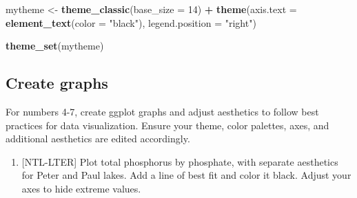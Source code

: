 \documentclass[]{article}
\newenvironment{Shaded}{\begin{snugshade}}{\end{snugshade}}
\newcommand{\DataTypeTok}[1]{\textcolor[rgb]{0.13,0.29,0.53}{#1}}
\newcommand{\DecValTok}[1]{\textcolor[rgb]{0.00,0.00,0.81}{#1}}
\newcommand{\KeywordTok}[1]{\textcolor[rgb]{0.13,0.29,0.53}{\textbf{#1}}}
\newcommand{\NormalTok}[1]{#1}
\newcommand{\OperatorTok}[1]{\textcolor[rgb]{0.81,0.36,0.00}{\textbf{#1}}}
\newcommand{\StringTok}[1]{\textcolor[rgb]{0.31,0.60,0.02}{#1}}
\providecommand{\tightlist}{%
  \setlength{\itemsep}{0pt}\setlength{\parskip}{0pt}}
\begin{document}
\begin{Shaded}
\begin{Highlighting}[]
\NormalTok{mytheme <-}\StringTok{ }\KeywordTok{theme_classic}\NormalTok{(}\DataTypeTok{base_size =} \DecValTok{14}\NormalTok{) }\OperatorTok{+}\StringTok{ }
\StringTok{  }\KeywordTok{theme}\NormalTok{(}\DataTypeTok{axis.text =} \KeywordTok{element_text}\NormalTok{(}\DataTypeTok{color =} \StringTok{"black"}\NormalTok{),  }
        \DataTypeTok{legend.position =} \StringTok{"right"}\NormalTok{) }

\KeywordTok{theme_set}\NormalTok{(mytheme)}
\end{Highlighting}
\end{Shaded}

\hypertarget{create-graphs}{%
\subsection{Create graphs}\label{create-graphs}}

For numbers 4-7, create ggplot graphs and adjust aesthetics to follow
best practices for data visualization. Ensure your theme, color
palettes, axes, and additional aesthetics are edited accordingly.

\begin{enumerate}
\def\labelenumi{\arabic{enumi}.}
\setcounter{enumi}{3}
\tightlist
\item
  {[}NTL-LTER{]} Plot total phosphorus by phosphate, with separate
  aesthetics for Peter and Paul lakes. Add a line of best fit and color
  it black. Adjust your axes to hide extreme values.
\end{enumerate}
\end{document}
